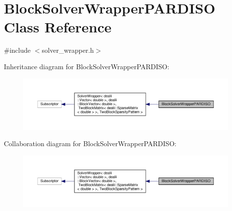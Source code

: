 \hypertarget{class_block_solver_wrapper_p_a_r_d_i_s_o}{}\section{Block\+Solver\+Wrapper\+P\+A\+R\+D\+I\+SO Class Reference}
\label{class_block_solver_wrapper_p_a_r_d_i_s_o}


{\ttfamily \#include $<$solver\+\_\+wrapper.\+h$>$}



Inheritance diagram for Block\+Solver\+Wrapper\+P\+A\+R\+D\+I\+SO\+:\nopagebreak
\begin{figure}[H]
\begin{center}
\leavevmode
\includegraphics[width=350pt]{class_block_solver_wrapper_p_a_r_d_i_s_o__inherit__graph}
\end{center}
\end{figure}


Collaboration diagram for Block\+Solver\+Wrapper\+P\+A\+R\+D\+I\+SO\+:\nopagebreak
\begin{figure}[H]
\begin{center}
\leavevmode
\includegraphics[width=350pt]{class_block_solver_wrapper_p_a_r_d_i_s_o__coll__graph}
\end{center}
\end{figure}
